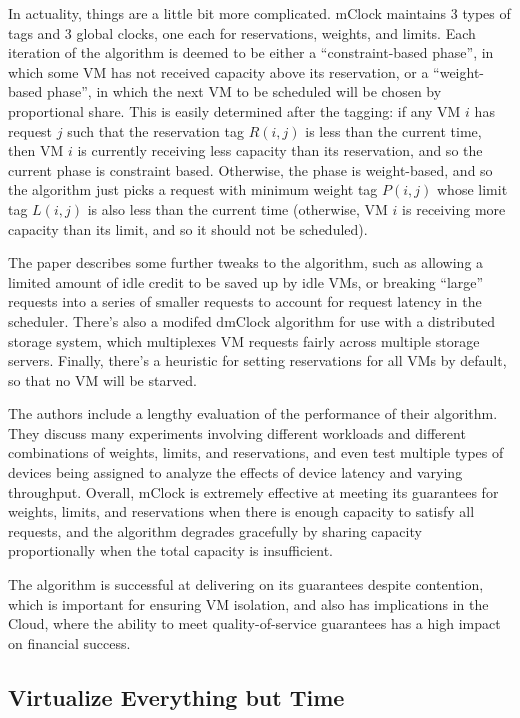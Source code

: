 \documentclass[letterpaper, twocolumn]{article}
\begin{document}
In actuality, things are a little bit more complicated.  mClock maintains
3 types of tags and 3 global clocks, one each for reservations, weights,
and limits.  Each iteration of the algorithm is deemed to be
either a ``constraint-based phase'', in which some VM has not received
capacity above its reservation, or a ``weight-based phase'', in which the
next VM to be scheduled will be chosen by proportional share.  This is easily
determined after the tagging:  if any VM $i$ has request $j$ such that the
reservation tag $R(i, j)$ is less than the current time, then VM $i$ is currently
receiving less capacity than its reservation, and so the current phase is
constraint based.  Otherwise, the phase is weight-based, and so the algorithm
just picks a request with minimum weight tag $P(i, j)$ whose limit tag
$L(i, j)$ is also less than the current time (otherwise, VM $i$ is receiving
more capacity than its limit, and so it should not be scheduled).

The paper describes some further tweaks to the algorithm, such as allowing
a limited amount of idle credit to be saved up by idle VMs, or breaking ``large''
requests into a series of smaller requests to account for request latency
in the scheduler.  There's also a modifed dmClock algorithm for use with
a distributed storage system, which multiplexes VM requests fairly across multiple
storage servers.  Finally, there's a heuristic for setting reservations for
all VMs by default, so that no VM will be starved.

The authors include a lengthy evaluation of the performance of their algorithm.
They discuss many experiments involving different workloads and different combinations
of weights, limits, and reservations, and even test multiple types of devices
being assigned to analyze the effects of device latency and varying throughput.
Overall, mClock is extremely effective at meeting its guarantees for weights, limits,
and reservations when there is enough capacity to satisfy all requests, and
the algorithm degrades gracefully by sharing capacity proportionally when
the total capacity is insufficient.

The algorithm is successful at delivering on its guarantees despite contention,
which is important for ensuring VM isolation, and also has implications in the Cloud,
where the ability to meet quality-of-service guarantees has a high impact on
financial success.

\subsection{Virtualize Everything but Time}
\label{sec:summaries/time}
\end{document}
